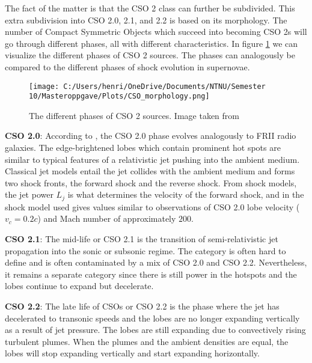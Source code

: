 The fact of the matter is that the CSO 2 class can further be subdivided. This extra subdivision into CSO 2.0, 2.1, and 2.2 is based on its morphology. The number of Compact Symmetric Objects which succeed into becoming CSO 2s will go through different phases, all with different characteristics. In figure \ref{fig:CSO_2_morphology} we can visualize the different phases of CSO 2 sources. The phases can analogously be compared to the different phases of shock evolution in supernovae.

\begin{figure}
    \centering
    \texttt{[image: C:/Users/henri/OneDrive/Documents/NTNU/Semester 10/Masteroppgave/Plots/CSO\_morphology.png]}
    \caption{The different phases of CSO 2 sources. Image taken from \cite{sullivan2024smallscale}}
    \label{fig:CSO_2_morphology}
\end{figure}

\textbf{CSO 2.0}: According to \cite{sullivan2024smallscale}, the CSO 2.0 phase evolves analogously to FRII radio galaxies. The edge-brightened lobes which contain prominent hot spots are similar to typical features of a relativistic jet pushing into the ambient medium. Classical jet models entail the jet collides with the ambient medium and forms two shock fronts, the forward shock and the reverse shock. From shock models, the jet power $L_j$ is what determines the velocity of the forward shock, and in \cite{sullivan2024smallscale} the shock model used gives values similar to observations of CSO 2.0 lobe velocity ($v_c = 0.2c$) and Mach number of approximately $200$.

\textbf{CSO 2.1}: The mid-life or CSO 2.1 is the transition of semi-relativistic jet propagation into the sonic or subsonic regime. The category is often hard to define and is often contaminated by a mix of CSO 2.0 and CSO 2.2. Nevertheless, it remains a separate category since there is still power in the hotspots and the lobes continue to expand but decelerate. 

\textbf{CSO 2.2}: The late life of CSOs or CSO 2.2 is the phase where the jet has decelerated to transonic speeds and the lobes are no longer expanding vertically as a result of jet pressure. The lobes are still expanding due to convectively rising turbulent plumes. When the plumes and the ambient densities are equal, the lobes will stop expanding vertically and start expanding horizontally. %


